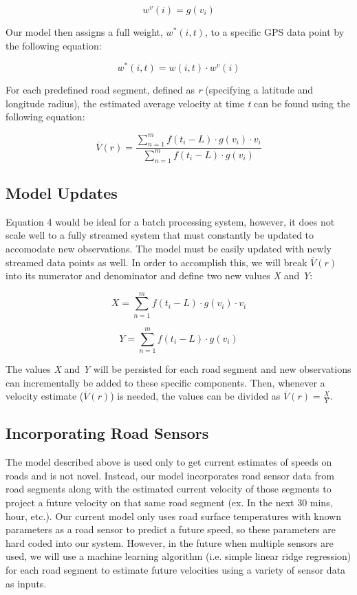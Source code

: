 \documentclass{vldb}
\begin{document}
\begin{equation}w^v(i)=g(v_i)\end{equation}

Our model then assigns a full weight, $w^*(i,t)$, to a specific GPS data point by the following equation:

\begin{equation}w^*(i,t)=w(i,t) \cdot w^v(i) \end{equation}

For each predefined road segment, defined as \textit{r} (specifying a latitude and longitude radius), the estimated average velocity at time \textit{t} can be found using the following equation:

\begin{equation}\overline{V}(r)=\frac{\sum_{n=1}^{m} f(t_i - L) \cdot g(v_i) \cdot v_i}{\sum_{n=1}^{m} f(t_i - L) \cdot g(v_i)}\end{equation}


\subsection{Model Updates}

Equation 4 would be ideal for a batch processing system, however, it does not scale well to a fully streamed system that must constantly be updated to accomodate new observations. The model must be easily updated with newly streamed data points as well. In order to accomplish this, we will break $\overline{V}(r)$ into its numerator and denominator and define two new values \textit{X} and \textit{Y}:

\begin{equation}X = \sum_{n=1}^{m} f(t_i - L) \cdot g(v_i) \cdot v_i\end{equation}

\begin{equation}Y = \sum_{n=1}^{m} f(t_i - L) \cdot g(v_i)\end{equation}

The values \textit{X} and \textit{Y} will be persisted for each road segment and new observations can incrementally be added to these specific components. Then, whenever a velocity estimate ($\overline{V}(r)$) is needed, the values can be divided as $\overline{V}(r)=\frac{X}{Y}$.


\subsection{Incorporating Road Sensors}
The model described above is used only to get current estimates of speeds on roads and is not novel. Instead, our model incorporates road sensor data from road segments along with the estimated current velocity of those segments to project a future velocity on that same road segment (ex. In the next 30 mins, hour, etc.). Our current model only uses road surface temperatures with known parameters as a road sensor to predict a future speed, so these parameters are hard coded into our system. However, in the future when multiple sensors are used, we will use a machine learning algorithm (i.e. simple linear ridge regression) for each road segment to estimate future velocities using a variety of sensor data as inputs. 
\end{document}
